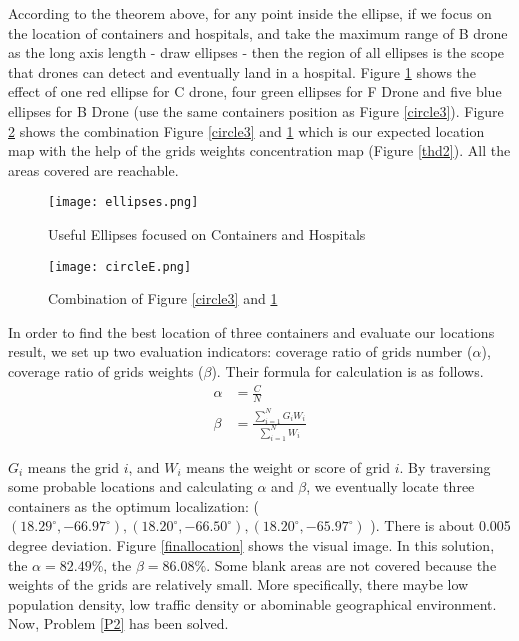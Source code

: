 \documentclass{mcmthesis}
\begin{document}
\begin{description}
	     According to the theorem above, for any point inside the ellipse, if we focus on the location of containers and hospitals, and take the maximum range of B drone as the long axis length - draw ellipses - then the region of all ellipses is the scope that drones can detect and eventually land in a hospital. Figure \ref{ellipses} shows the effect of one red ellipse for C drone, four green ellipses for F Drone and five blue ellipses for B Drone (use the same containers position as Figure \ref{circle3}). Figure \ref{circleE} shows the combination Figure \ref{circle3} and \ref{ellipses} which is our expected location map with the help of the grids weights concentration map (Figure \ref{thd2}). All the areas covered are reachable. 
	     
	        \begin{figure}[H]                                         
	     	\centering
	     	\texttt{[image: ellipses.png]}        
	     	\caption{Useful Ellipses focused on Containers and Hospitals}                           
	     	\label{ellipses}                                          
	     \end{figure}
	     
	       \begin{figure}[H]                                         
	     	\centering
	     	\texttt{[image: circleE.png]}        
	     	\caption{Combination of Figure \ref{circle3} and \ref{ellipses} }                          
	     	\label{circleE}                                          
	     \end{figure}
	\end{description}

	In order to find the best location of three containers and evaluate our locations result, we set up two evaluation indicators: coverage ratio of grids number ($\alpha$), coverage ratio of grids weights ($\beta$). Their formula for calculation is as follows.
	\begin{align}
	\alpha&= \frac{C}{N} \\
	\beta&=\frac{{\sum\limits_{i = 1}^N {{G_i}{W_i}} }}{{\sum\limits_{i = 1}^N {{W_i}} }}
	\end{align} \par
   $G_i$ means the grid $i$, and $W_i$ means the weight or score of grid $i$. By traversing some probable locations and calculating $\alpha$ and $\beta$, we eventually locate three containers as the optimum localization: ( $(18.29^\circ, -66.97^\circ), (18.20^\circ, -66.50^\circ), (18.20^\circ, -65.97^\circ)$ ). There is about 0.005 degree deviation. Figure \ref{finallocation} shows the visual image. In this solution, the $\alpha=82.49\%$, the $\beta = 86.08\%$. Some blank areas are not covered because the weights of the grids are relatively small. More specifically, there maybe low population density, low traffic density or abominable geographical environment. \textcolor[rgb]{1.00,0.00,0.00}{Now, Problem \ref{P2} has been solved.}   
   
\end{document}
